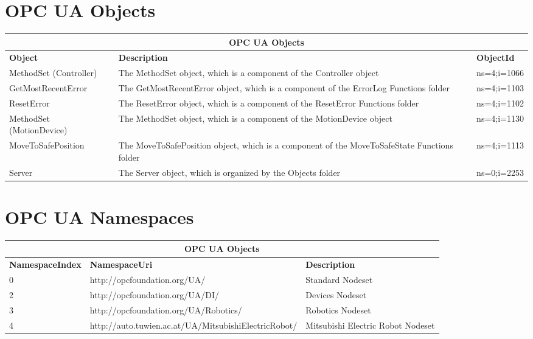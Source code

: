 \documentclass{article}
\begin{document}
\section{OPC UA Objects}
\begin{center}
	\setlength\extrarowheight{4pt}
	\small
	\begin{tabularx}{\textwidth}{|p{4cm}|X|p{2cm}|}
		\hline
		\multicolumn{3}{|c|}{\bf \color{black} \large OPC UA Objects}\\
		\hline\hline
		\bf Object &\bf Description & \bf ObjectId \\
		\hline\hline
		MethodSet (Controller) & The MethodSet object, which is a component of the Controller object & ns=4;i=1066 \\ \hline
		GetMostRecentError & The GetMostRecentError object, which is a component of the ErrorLog Functions folder & ns=4;i=1103 \\ \hline
		ResetError & The ResetError object, which is a component of the ResetError Functions folder & ns=4;i=1102 \\ \hline
		MethodSet (MotionDevice) & The MethodSet object, which is a component of the MotionDevice object & ns=4;i=1130 \\ \hline
		MoveToSafePosition & The MoveToSafePosition object, which is a component of the MoveToSafeState Functions folder & ns=4;i=1113 \\ \hline
		Server & The Server object, which is organized by the Objects folder & ns=0;i=2253 \\ \hline
	\end{tabularx}
\end{center}

\section{OPC UA Namespaces}
\begin{center}
	\setlength\extrarowheight{4pt}
	\small
	\begin{tabularx}{\textwidth}{|p{3cm}|p{8cm}|X|}
		\hline
		\multicolumn{3}{|c|}{\bf \color{black} \large OPC UA Objects}\\
		\hline\hline
		\bf NamespaceIndex &\bf NamespaceUri & \bf Description \\
		\hline\hline
		0 & http://opcfoundation.org/UA/ & Standard Nodeset\\ \hline
		2 & http://opcfoundation.org/UA/DI/ & Devices Nodeset\\ \hline
		3 & http://opcfoundation.org/UA/Robotics/ & Robotics Nodeset\\ \hline
		4 & http://auto.tuwien.ac.at/UA/MitsubishiElectricRobot/ & Mitsubishi Electric Robot Nodeset\\ \hline
	\end{tabularx}
\end{center}
\end{document}
